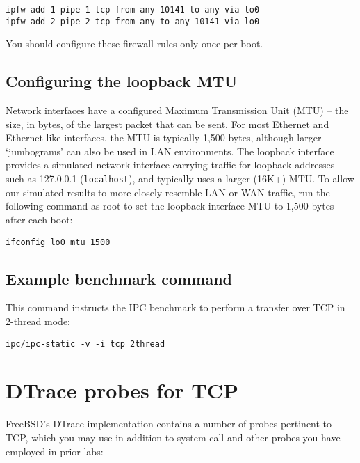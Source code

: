 \documentclass[a4paper,10pt]{article}
\begin{document}
\begin{verbatim}
ipfw add 1 pipe 1 tcp from any 10141 to any via lo0
ipfw add 2 pipe 2 tcp from any to any 10141 via lo0
\end{verbatim}

\noindent
You should configure these firewall rules only once per boot.

\subsection*{Configuring the loopback MTU}

Network interfaces have a configured Maximum Transmission Unit (MTU) -- the
size, in bytes, of the largest packet that can be sent.
For most Ethernet and Ethernet-like interfaces, the MTU is typically 1,500
bytes, although larger `jumbograms' can also be used in LAN environments.
The loopback interface provides a simulated network interface carrying
traffic for loopback addresses such as 127.0.0.1 (\texttt{localhost}), and
typically uses a larger (16K+) MTU.
To allow our simulated results to more closely resemble LAN or WAN traffic,
run the following command as root to set the loopback-interface MTU to 1,500
bytes after each boot:

\begin{verbatim}
ifconfig lo0 mtu 1500
\end{verbatim}

\subsection*{Example benchmark command}

This command instructs the IPC benchmark to perform a transfer over TCP in
2-thread mode:

\begin{verbatim}
ipc/ipc-static -v -i tcp 2thread
\end{verbatim}

\section*{DTrace probes for TCP}

FreeBSD's DTrace implementation contains a number of probes pertinent to TCP,
which you may use in addition to system-call and other probes you have
employed in prior labs:
\end{document}
